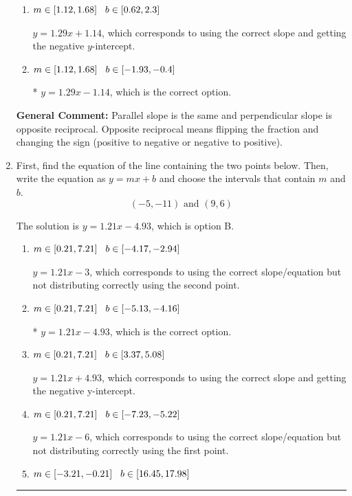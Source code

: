 \documentclass{extbook}[14pt]
\newcommand{\litem}[1]{\item #1

\rule{\textwidth}{0.4pt}}
\begin{document}
\begin{enumerate}
{\begin{enumerate}[label=\Alph*.]
 $y = -1.29x - 8.86$, which corresponds to using the negative slope.
\item \( m \in [1.12, 1.68] \hspace*{3mm} b \in [0.62, 2.3] \)

 $y = 1.29x + 1.14$, which corresponds to using the correct slope and getting the negative $y$-intercept.
\item \( m \in [1.12, 1.68] \hspace*{3mm} b \in [-1.93, -0.4] \)

* $y = 1.29x - 1.14$, which is the correct option.
\end{enumerate}

\textbf{General Comment:} Parallel slope is the same and perpendicular slope is opposite reciprocal. Opposite reciprocal means flipping the fraction and changing the sign (positive to negative or negative to positive).
}
\litem{
First, find the equation of the line containing the two points below. Then, write the equation as $ y=mx+b $ and choose the intervals that contain $m$ and $b$.
\[ (-5, -11) \text{ and } (9, 6) \]

The solution is \( y = 1.21x -4.93 \), which is option B.\begin{enumerate}[label=\Alph*.]
\item \( m \in [0.21, 7.21] \hspace*{3mm} b \in [-4.17, -2.94] \)

 $y = 1.21x -3$, which corresponds to using the correct slope/equation but not distributing correctly using the second point.
\item \( m \in [0.21, 7.21] \hspace*{3mm} b \in [-5.13, -4.16] \)

* $y = 1.21x -4.93$, which is the correct option.
\item \( m \in [0.21, 7.21] \hspace*{3mm} b \in [3.37, 5.08] \)

 $y = 1.21x + 4.93$, which corresponds to using the correct slope and getting the negative y-intercept.
\item \( m \in [0.21, 7.21] \hspace*{3mm} b \in [-7.23, -5.22] \)

 $y = 1.21x -6$, which corresponds to using the correct slope/equation but not distributing correctly using the first point.
\item \( m \in [-3.21, -0.21] \hspace*{3mm} b \in [16.45, 17.98] \)


\end{enumerate}}
\end{enumerate}
\end{document}
